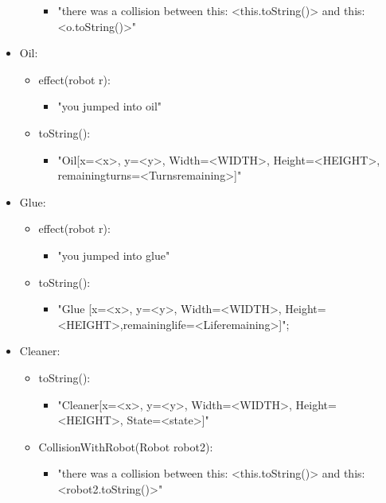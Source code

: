 \begin{itemize}
\begin{itemize}
	        \begin{itemize}
	        \item  "there was a collision between this: <this.toString()> and this: <o.toString()>"
	        
	        \end{itemize}
	\end{itemize}
	
	
\item Oil:
	\begin{itemize}
	\item effect(robot r):
	        \begin{itemize}
	        \item  "you jumped into oil"
	        \end{itemize}
	\item toString():
	       \begin{itemize}
	        \item "Oil[x=<x>, y=<y>, Width=<WIDTH>, Height=<HEIGHT>, remainingturns=<Turnsremaining>]"
	       \end{itemize}
	\end{itemize}
\item Glue:
	\begin{itemize}
	\item effect(robot r):
	        \begin{itemize}
	        \item "you jumped into glue"
	        \end{itemize}
	\item toString():
	       \begin{itemize}
	        \item"Glue [x=<x>, y=<y>, Width=<WIDTH>, Height=<HEIGHT>,remaininglife=<Liferemaining>]";
	       \end{itemize}
	\end{itemize}

\item Cleaner:
	\begin{itemize}
	\item toString():
	       \begin{itemize}
	        \item "Cleaner[x=<x>, y=<y>, Width=<WIDTH>, Height=<HEIGHT>, State=<state>]"
	       \end{itemize}
	 \item CollisionWithRobot(Robot robot2):     
	        \begin{itemize}
	        \item  "there was a collision between this: <this.toString()> and this: <robot2.toString()>"
	        

\end{itemize}
\end{itemize}
\end{itemize}
